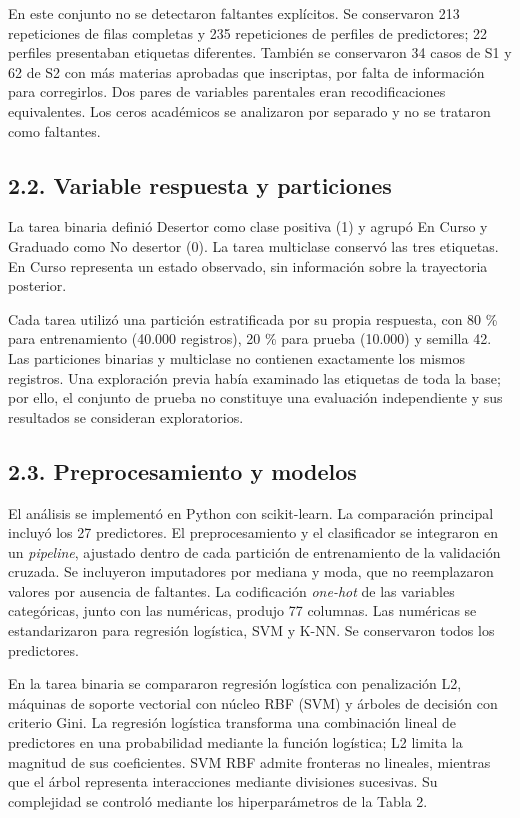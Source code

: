\documentclass[10pt,a4paper]{article}
\begin{document}
En este conjunto no se detectaron faltantes explícitos. Se conservaron 213 repeticiones de filas completas y 235 repeticiones de perfiles de
predictores; 22 perfiles presentaban etiquetas diferentes. También se conservaron 34 casos de S1 y 62 de S2 con más materias aprobadas que inscriptas,
por falta de información para corregirlos. Dos pares de variables parentales eran recodificaciones equivalentes. Los ceros académicos se analizaron
por separado y no se trataron como faltantes.

\hypertarget{variable-respuesta-y-particiones}{%
\subsection{2.2. Variable respuesta y particiones}\label{variable-respuesta-y-particiones}}

La tarea binaria definió Desertor como clase positiva (1) y agrupó En Curso y Graduado como No desertor (0). La tarea multiclase conservó las tres
etiquetas. En Curso representa un estado observado, sin información sobre la trayectoria posterior.

Cada tarea utilizó una partición estratificada por su propia respuesta, con 80 \% para entrenamiento (40.000 registros), 20 \% para prueba (10.000) y
semilla 42. Las particiones binarias y multiclase no contienen exactamente los mismos registros. Una exploración previa había examinado las etiquetas
de toda la base; por ello, el conjunto de prueba no constituye una evaluación independiente y sus resultados se consideran exploratorios.

\hypertarget{preprocesamiento-y-modelos}{%
\subsection{2.3. Preprocesamiento y modelos}\label{preprocesamiento-y-modelos}}

El análisis se implementó en Python con scikit-learn. La comparación principal incluyó los 27 predictores. El preprocesamiento y el clasificador se
integraron en un \emph{pipeline}, ajustado dentro de cada partición de entrenamiento de la validación cruzada. Se incluyeron imputadores por mediana y
moda, que no reemplazaron valores por ausencia de faltantes. La codificación \emph{one-hot} de las variables categóricas, junto con las numéricas,
produjo 77 columnas. Las numéricas se estandarizaron para regresión logística, SVM y K-NN. Se conservaron todos los predictores.

En la tarea binaria se compararon regresión logística con penalización L2, máquinas de soporte vectorial con núcleo RBF (SVM) y árboles de decisión
con criterio Gini. La regresión logística transforma una combinación lineal de predictores en una probabilidad mediante la función logística; L2
limita la magnitud de sus coeficientes. SVM RBF admite fronteras no lineales, mientras que el árbol representa interacciones mediante divisiones
sucesivas. Su complejidad se controló mediante los hiperparámetros de la Tabla 2.
\end{document}
